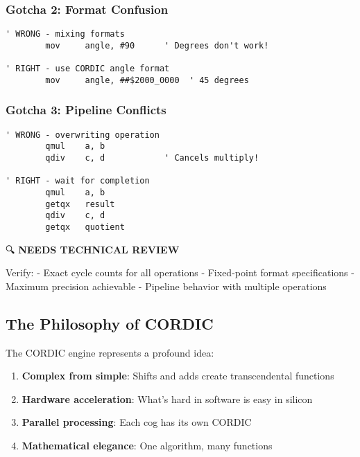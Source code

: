 \documentclass[11pt]{book}
\providecommand{\tightlist}{%
  \setlength{\itemsep}{0pt}\setlength{\parskip}{0pt}}
\begin{document}
\hypertarget{gotcha-2-format-confusion}{%
\subsubsection{Gotcha 2: Format
Confusion}\label{gotcha-2-format-confusion}}

\begin{lstlisting}
' WRONG - mixing formats
        mov     angle, #90      ' Degrees don't work!
        
' RIGHT - use CORDIC angle format
        mov     angle, ##$2000_0000  ' 45 degrees
\end{lstlisting}

\hypertarget{gotcha-3-pipeline-conflicts}{%
\subsubsection{Gotcha 3: Pipeline
Conflicts}\label{gotcha-3-pipeline-conflicts}}

\begin{lstlisting}
' WRONG - overwriting operation
        qmul    a, b
        qdiv    c, d            ' Cancels multiply!
        
' RIGHT - wait for completion
        qmul    a, b
        getqx   result
        qdiv    c, d
        getqx   quotient
\end{lstlisting}

\begin{review}
🔍 \textbf{NEEDS TECHNICAL REVIEW}

Verify:
- Exact cycle counts for all operations
- Fixed-point format specifications
- Maximum precision achievable
- Pipeline behavior with multiple operations
\end{review}

\hypertarget{the-philosophy-of-cordic}{%
\subsection{The Philosophy of CORDIC}\label{the-philosophy-of-cordic}}

The CORDIC engine represents a profound idea:

\begin{enumerate}
\def\labelenumi{\arabic{enumi}.}
\tightlist
\item
  \textbf{Complex from simple}: Shifts and adds create transcendental
  functions
\item
  \textbf{Hardware acceleration}: What's hard in software is easy in
  silicon
\item
  \textbf{Parallel processing}: Each cog has its own CORDIC
\item
  \textbf{Mathematical elegance}: One algorithm, many functions
\end{enumerate}
\end{document}
